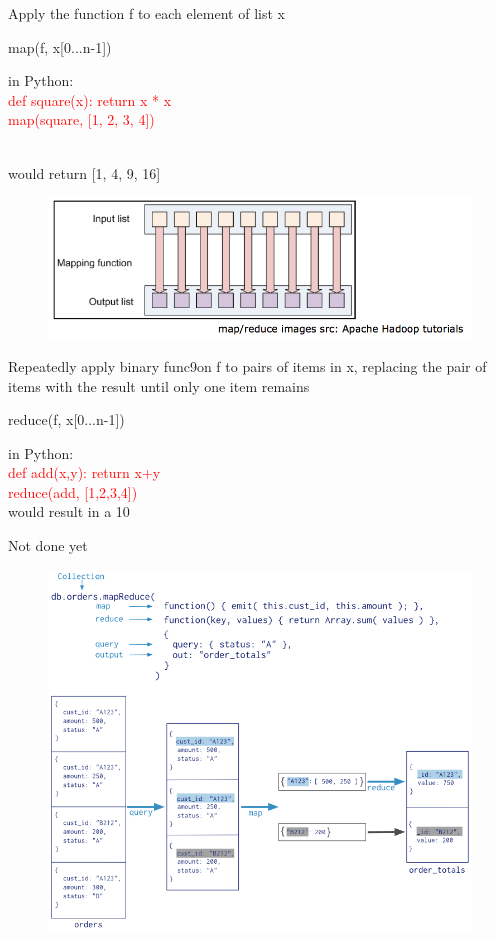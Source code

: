 \documentclass{beamer}
\newcommand{\red}[1]{
\textcolor{red}{#1}
}
\begin{document}
\begin{slide}{
\item Apply the function f to each element of list x
\item map(f, x[0...n-1])
\item in Python: \\
\red{def square(x):  return x * x \\
 map(square, [1, 2, 3, 4]) }
 \\ would return [1, 4, 9, 16]
\begin{figure}
		\includegraphics[scale=0.23]{img/map}
\end{figure}
}\end{slide}

\begin{slide}{
\item Repeatedly apply binary func9on f to pairs of items in x, replacing the pair of items with the result until only one item remains
\item reduce(f, x[0...n-1])
\item in Python: \\
\red{def add(x,y): return x+y \\
reduce(add, [1,2,3,4])}\\
would result in a 10
}\end{slide}

\begin{slide}{
\item Not done yet
\begin{figure}
		\includegraphics[scale=0.23]{img/map-reduce}
\end{figure}
}\end{slide}
\end{document}
